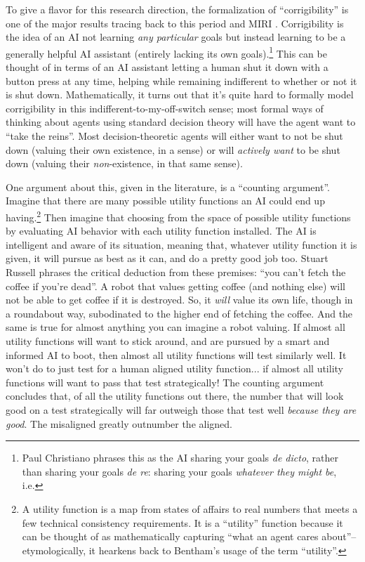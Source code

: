 To give a flavor for this research direction, the formalization of
``corrigibility'' is one of the major results tracing back to this period and
MIRI \cite{soares2015corrigibility}. Corrigibility is the idea of an AI not
learning \emph{any particular} goals but instead learning to be a generally
helpful AI assistant (entirely lacking its own goals).\footnote{Paul Christiano
phrases this as the AI sharing your goals \emph{de dicto}, rather than sharing
your goals \emph{de re}: sharing your goals \emph{whatever they might be},
i.e.} This can be thought of in terms of an AI assistant letting a human shut
it down with a button press at any time, helping while remaining indifferent to
whether or not it is shut down. Mathematically, it turns out that it's quite
hard to formally model corrigibility in this indifferent-to-my-off-switch
sense; most formal ways of thinking about agents using standard decision theory
will have the agent want to ``take the reins''. Most decision-theoretic agents
will either want to not be shut down (valuing their own existence, in a sense)
or will \emph{actively want} to be shut down (valuing their
\emph{non}-existence, in that same sense).

One argument about this, given in the literature, is a ``counting argument''.
Imagine that there are many possible utility functions an AI could end up
having.\footnote{A utility function is a map from states of affairs to real
numbers that meets a few technical consistency requirements. It is a
``utility'' function because it can be thought of as mathematically capturing
``what an agent cares about''--etymologically, it hearkens back to Bentham's
usage of the term ``utility''.} Then imagine that choosing from the space of
possible utility functions by evaluating AI behavior with each utility function
installed. The AI is intelligent and aware of its situation, meaning that,
whatever utility function it is given, it will pursue as best as it can, and do
a pretty good job too. Stuart Russell \cite{russell2019human} phrases the
critical deduction from these premises: ``you can't fetch the coffee if you're
dead''. A robot that values getting coffee (and nothing else) will not be able
to get coffee if it is destroyed. So, it \emph{will} value its own life, though
in a roundabout way, subodinated to the higher end of fetching the coffee. And
the same is true for almost anything you can imagine a robot valuing. If almost
all utility functions will want to stick around, and are pursued by a smart and
informed AI to boot, then almost all utility functions will test similarly
well. It won't do to just test for a human aligned utility function... if
almost all utility functions will want to pass that test strategically! The
counting argument concludes that, of all the utility functions out there, the
number that will look good on a test strategically will far outweigh those that
test well \emph{because they are good}. The misaligned greatly outnumber the
aligned.

